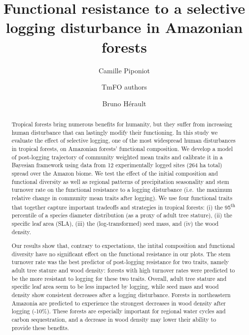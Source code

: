\documentclass[]{elsarticle} %
\begin{document}
\begin{frontmatter}

  \title{Functional resistance to a selective logging disturbance in Amazonian
forests}
    \author[1]{Camille Piponiot}
    \author[]{TmFO authors}
  
  
    \author[1, 2]{Bruno Hérault}
  
      \address[1]{Cirad, UR Forets et Societes, Montferrier-sur-Lez, France}
    \address[2]{INPHB, Yamoussoukro, Cote d'Ivoire}
  
  \begin{abstract}
  Tropical forests bring numerous benefits for humanity, but they suffer
  from increasing human disturbance that can lastingly modify their
  functioning. In this study we evaluate the effect of selective logging,
  one of the most widespread human disturbances in tropical forests, on
  Amazonian forests' functional composition. We develop a model of
  post-logging trajectory of community weighted mean traits and calibrate
  it in a Bayesian framework using data from 12 experimentally logged
  sites (264 ha total) spread over the Amazon biome. We test the effect of
  the initial composition and functional diversity as well as regional
  patterns of precipitation seasonality and stem turnover rate on the
  functional resistance to a logging disturbance (i.e.~the maximum
  relative change in community mean traits after logging). We use four
  functional traits that together capture important tradeoffs and
  strategies in tropical forests: (i) the 95\textsuperscript{th}
  percentile of a species diameter distribution (as a proxy of adult tree
  stature), (ii) the specific leaf area (SLA), (iii) the (log-transformed)
  seed mass, and (iv) the wood density.
  
  Our results show that, contrary to expectations, the intital composition
  and functional diversity have no significant effect on the functional
  resistance in our plots. The stem turnover rate was the best predictor
  of post-logging resistance for two traits, namely adult tree stature and
  wood density: forests with high turnover rates were predicted to be the
  more resistant to logging for these two traits. Overall, adult tree
  stature and specific leaf area seem to be less impacted by logging,
  while seed mass and wood density show consistent decreases after a
  logging disturbance. Forests in northeastern Amazonia are predicted to
  experience the strongest decreases in wood density after logging
  (-10\%). These forests are especially important for regional water
  cycles and carbon sequestration, and a decrease in wood density may
  lower their ability to provide these benefits.
  \end{abstract}
  
 \end{frontmatter}
\end{document}
